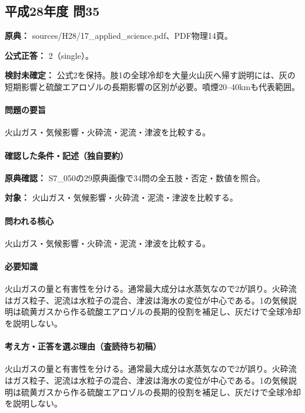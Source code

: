 \subsection{平成28年度 問35}
\label{q:h28-reg-applied-35}

\noindent\textbf{原典：} sources/H28/17\_applied\_science.pdf、PDF物理14頁。

\textbf{公式正答：} 2（single）。

\par\textbf{検討未確定：} 公式2を保持。肢1の全球冷却を大量火山灰へ帰す説明には、灰の短期影響と硫酸エアロゾルの長期影響の区別が必要。噴煙20–40kmも代表範囲。

\paragraph{問題の要旨} 火山ガス・気候影響・火砕流・泥流・津波を比較する。

\paragraph{確認した条件・記述（独自要約）}\mbox{}\par

\noindent\textbf{原典確認：} S7\_050の29原典画像で34問の全五肢・否定・数値を照合。\par

\noindent\textbf{対象：} 火山ガス・気候影響・火砕流・泥流・津波を比較する。\par

\paragraph{問われる核心} 火山ガス・気候影響・火砕流・泥流・津波を比較する。

\paragraph{必要知識} 火山ガスの量と有害性を分ける。通常最大成分は水蒸気なので2が誤り。火砕流はガス粒子、泥流は水粒子の混合、津波は海水の変位が中心である。1の気候説明は硫黄ガスから作る硫酸エアロゾルの長期的役割を補足し、灰だけで全球冷却を説明しない。

\paragraph{考え方・正答を選ぶ理由（査読待ち初稿）} 火山ガスの量と有害性を分ける。通常最大成分は水蒸気なので2が誤り。火砕流はガス粒子、泥流は水粒子の混合、津波は海水の変位が中心である。1の気候説明は硫黄ガスから作る硫酸エアロゾルの長期的役割を補足し、灰だけで全球冷却を説明しない。

